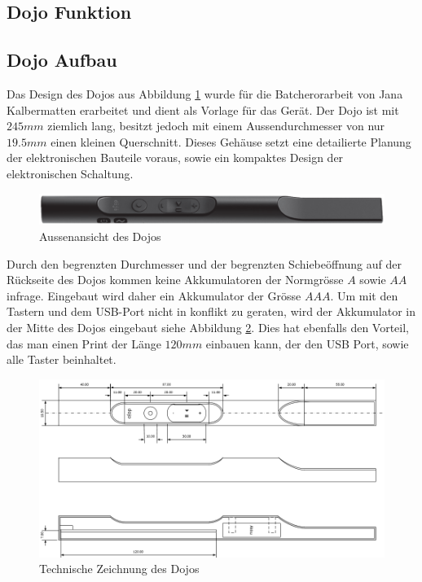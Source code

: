 \subsection{Dojo Funktion}


\subsection{Dojo Aufbau}
Das Design des Dojos aus Abbildung \ref{fig:DojoBild} wurde für die Batcherorarbeit von Jana Kalbermatten erarbeitet und dient als Vorlage für das Gerät. Der Dojo ist mit $245mm$ ziemlich lang, besitzt jedoch mit einem Aussendurchmesser von nur $19.5mm$ einen kleinen Querschnitt. Dieses Gehäuse setzt eine detailierte Planung der elektronischen Bauteile voraus, sowie ein kompaktes Design der elektronischen Schaltung.


\begin{figure}[h]
	\centering
	\includegraphics[width=\textwidth]{graphics/DojoBild.png}
	\caption{Aussenansicht des Dojos}
	\label{fig:DojoBild}
\end{figure}

Durch den begrenzten Durchmesser und der begrenzten Schiebeöffnung auf der Rückseite des Dojos kommen keine Akkumulatoren der Normgrösse $A$ sowie $AA$ infrage. Eingebaut wird daher ein Akkumulator der Grösse $AAA$. Um mit den Tastern und dem USB-Port nicht in konflikt zu geraten, wird der Akkumulator in der Mitte des Dojos eingebaut siehe Abbildung \ref{fig:DojoQuerschnitt}. Dies hat ebenfalls den Vorteil, das man einen Print der Länge $120mm$ einbauen kann, der den USB Port, sowie alle Taster beinhaltet.

\begin{figure}[h]
	\centering
	\includegraphics[width=\textwidth]{graphics/DojoQuerschnitt.png}
	\caption{Technische Zeichnung des Dojos}
	\label{fig:DojoQuerschnitt}
\end{figure}

